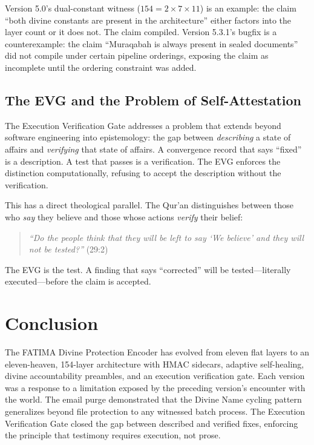 \documentclass[11pt,a4paper]{article}
\begin{document}
Version 5.0's dual-constant witness ($154 = 2 \times 7 \times 11$) is an example: the claim ``both divine constants are present in the architecture'' either factors into the layer count or it does not. The claim compiled. Version 5.3.1's bugfix is a counterexample: the claim ``Muraqabah is always present in sealed documents'' did not compile under certain pipeline orderings, exposing the claim as incomplete until the ordering constraint was added.

\subsection{The EVG and the Problem of Self-Attestation}

The Execution Verification Gate addresses a problem that extends beyond software engineering into epistemology: the gap between \textit{describing} a state of affairs and \textit{verifying} that state of affairs. A convergence record that says ``fixed'' is a description. A test that passes is a verification. The EVG enforces the distinction computationally, refusing to accept the description without the verification.

This has a direct theological parallel. The Qur'an distinguishes between those who \textit{say} they believe and those whose actions \textit{verify} their belief:

\begin{quote}
\textit{``Do the people think that they will be left to say `We believe' and they will not be tested?''} (29:2)
\end{quote}

The EVG is the test. A finding that says ``corrected'' will be tested---literally executed---before the claim is accepted.


\section{Conclusion}

The FATIMA Divine Protection Encoder has evolved from eleven flat layers to an eleven-heaven, 154-layer architecture with HMAC sidecars, adaptive self-healing, divine accountability preambles, and an execution verification gate. Each version was a response to a limitation exposed by the preceding version's encounter with the world. The email purge demonstrated that the Divine Name cycling pattern generalizes beyond file protection to any witnessed batch process. The Execution Verification Gate closed the gap between described and verified fixes, enforcing the principle that testimony requires execution, not prose.
\end{document}
